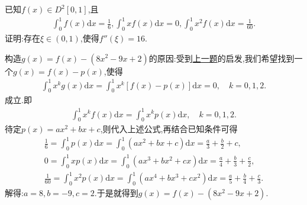 \documentclass[../../main.tex]{subfiles}%
\begin{document}
\begin{example}
已知$f(x)\in D^2[0,1]$,且
\begin{align*}
\int_0^1{f\left( x \right) \mathrm{d}x}=\frac{1}{6},\int_0^1{xf\left( x \right) \mathrm{d}x}=0,\int_0^1{x^2f\left( x \right) \mathrm{d}x}=\frac{1}{60}.
\end{align*}
证明:存在$\xi \in (0,1)$,使得$f''(\xi)=16$.
\end{example}
\begin{note}
构造$g(x)=f(x)-(8x^2 - 9x + 2)$的原因:受到\hyperref[proposition:x^kf积分为0则f至少有n+1个零点]{上一题}的启发,我们希望找到一个$g(x)=f(x)-p(x)$,使得
\begin{align*}
\int_0^1 x^k g(x)\mathrm{d}x =\int_0^1 x^k [f(x)-p(x)]\mathrm{d}x = 0, \quad k = 0,1,2.
\end{align*}
成立.即
\begin{align*}
\int_0^1{x^kf(x)\mathrm{d}x}=\int_0^1{x^kp(x)\mathrm{d}x},\quad k=0,1,2.
\end{align*}
待定$p(x)=ax^2+bx+c$,则代入上述公式,再结合已知条件可得
\begin{gather*}
\frac{1}{6}=\int_0^1{p(x)\mathrm{d}x}=\int_0^1{\left( ax^2+bx+c \right) \mathrm{d}x}=\frac{a}{3}+\frac{b}{2}+c,
\\
0=\int_0^1{xp(x)\mathrm{d}x}=\int_0^1{\left( ax^3+bx^2+cx \right) \mathrm{d}x}=\frac{a}{4}+\frac{b}{3}+\frac{c}{2},
\\
\frac{1}{60}=\int_0^1{x^2p(x)\mathrm{d}x}=\int_0^1{\left( ax^4+bx^3+cx^2 \right) \mathrm{d}x}=\frac{a}{5}+\frac{b}{4}+\frac{c}{3}.
\end{gather*}
解得:$a=8,b=-9,c=2$.于是就得到\(g(x)=f(x)-(8x^2 - 9x + 2)\).
\end{note}
\end{document}

